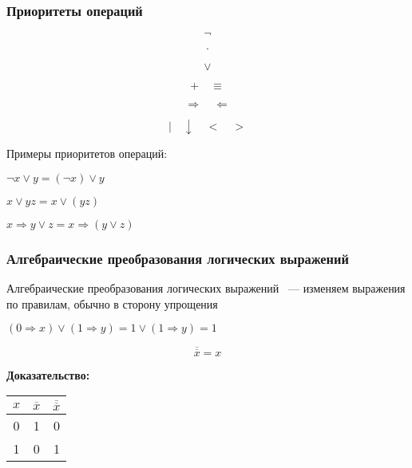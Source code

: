 \documentclass[russian]{lecture-notes}
\begin{document}
\begin{sloppypar}
        \subsubsection{Приоритеты операций}

        $$\neg$$

        $$\cdot$$

        $$\lor$$

        $$+ \quad \equiv$$

        $$\Rightarrow \quad \Leftarrow$$

        $$| \quad \downarrow \quad < \quad >$$

        \begin{example}
            Примеры приоритетов операций:

            $\neg x \lor y = (\neg x) \lor y$

            $x \lor y z = x \lor (y z)$

            $x \Rightarrow y \lor z = x \Rightarrow (y \lor z)$
        \end{example}

        \subsubsection{Алгебраические преобразования логических выражений}

        \begin{definition}
            Алгебраические преобразования логических выражений ~--- изменяем выражения по правилам, обычно в сторону упрощения
        \end{definition}

        \begin{example}
            $(0 \Rightarrow x) \lor (1 \Rightarrow y) = 1 \lor (1 \Rightarrow y) = 1$
        \end{example}

        \begin{proposition*}
            $$\overline{\overline{x}} = x$$

            \textbf{Доказательство:}

            \begin{table}[h!]
                \centering
                \begin{tabular}{|c|c|c|}
                    \hline
                    $x$ & $\overline{x}$ & $\overline{\overline{x}}$ \\ \hline
                    0      & 1              & 0                         \\ \hline
                    1      & 0              & 1                         \\ \hline
                \end{tabular}
            \end{table}


\end{proposition*}
\end{sloppypar}
\end{document}
